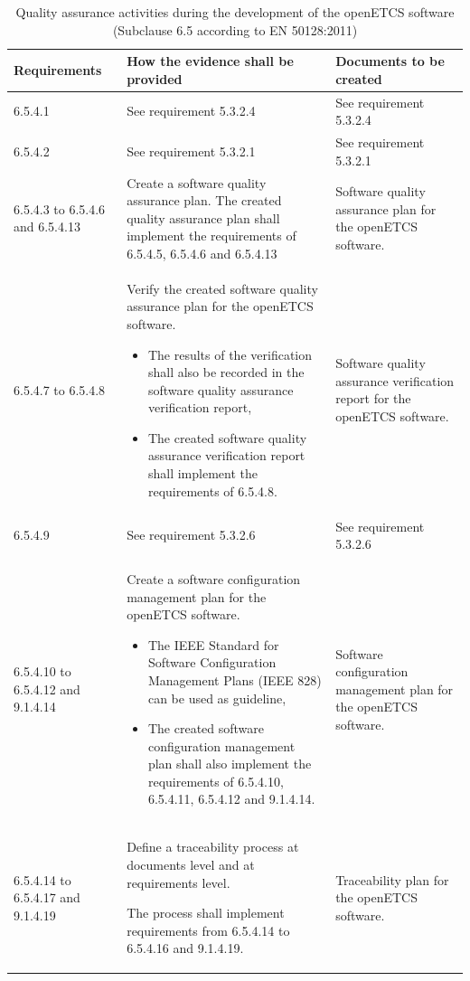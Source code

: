 \documentclass{template/openetcs_report}
\begin{document}
{\footnotesize\sffamily\centering
\begin{longtable}{|p{2cm}|p{9cm}|p{3cm}|}
\caption{Quality assurance activities during the development of the openETCS software (Subclause 6.5 according to EN 50128:2011)}\\
\hline
\bfseries Requirements & \bfseries How the evidence shall be provided & \bfseries Documents to be created\\
\hline
\hline
\endhead
\hline
\endfoot

6.5.4.1 & See requirement 5.3.2.4 & See requirement 5.3.2.4\\ 
\hline
6.5.4.2 & See requirement 5.3.2.1 & See requirement 5.3.2.1\\ 
\hline
6.5.4.3 to 6.5.4.6 and 6.5.4.13 & Create a software quality assurance plan.
The created quality assurance plan shall implement the requirements of 6.5.4.5, 6.5.4.6 and 6.5.4.13
& Software quality assurance plan for the openETCS software.\\ 
\hline
6.5.4.7 to 6.5.4.8 & Verify the created software quality assurance plan for the openETCS software. 
\begin{itemize}\itemsep=0pt
  \item The results of the verification shall also be recorded in the software quality assurance verification report,
  \item The created software quality assurance verification report shall implement the requirements of  6.5.4.8. 
\end{itemize}
& Software quality assurance verification report for the openETCS software.\\ 
\hline
6.5.4.9 & See requirement 5.3.2.6 & See requirement 5.3.2.6\\ 
\hline
6.5.4.10 to 6.5.4.12 and 9.1.4.14 & Create a software configuration management plan for the openETCS software.
\begin{itemize}\itemsep=0pt
  \item The IEEE Standard for Software Configuration Management Plans (IEEE 828) can be used as guideline,
  \item The created software configuration management plan shall also implement the requirements of 6.5.4.10, 6.5.4.11, 6.5.4.12 and 9.1.4.14. 
\end{itemize}
& Software configuration management plan for the openETCS software.\\ 
\hline
6.5.4.14 to 6.5.4.17 and 9.1.4.19 & Define a traceability process at documents level and at requirements
level.

The process shall implement requirements from 6.5.4.14 to 6.5.4.16 and 9.1.4.19.
& Traceability plan for the openETCS software.\\ 
\hline
\end{longtable}}
\end{document}
